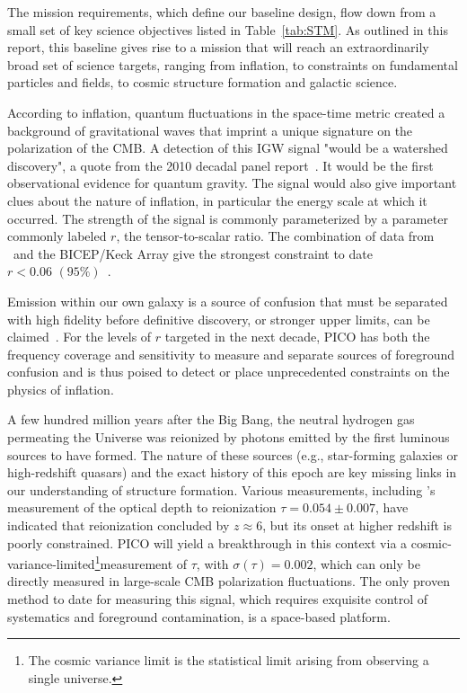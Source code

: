 \documentclass[PICOReport.tex]{subfiles}
\begin{document}
The mission requirements, which define our baseline design, flow down from a small set of key science objectives listed in Table~\ref{tab:STM}. As outlined in this report, this baseline gives rise to a mission that will reach an extraordinarily broad set of science targets, ranging from inflation, to constraints on fundamental particles and fields, to cosmic structure formation and galactic science.

According to inflation, quantum fluctuations in the space-time metric created a background of gravitational waves that imprint a unique signature on the polarization of the CMB. A detection of this \ac{IGW} signal "would be a watershed discovery", a quote from the 2010 decadal panel report~\citep{blandford2010}. It would be the first observational evidence for quantum gravity. The signal would also give important clues about the nature of inflation, in particular the energy scale at which it occurred. The strength of the signal is commonly parameterized by a parameter commonly labeled $r$, the tensor-to-scalar ratio. The combination of data from \planck\ and the BICEP/Keck Array give the strongest constraint to date $r<0.06\,\, (95\%)$~\citep{2018arXiv181005216A}.

Emission within our own galaxy is a source of confusion that must be separated with high fidelity before definitive discovery, or stronger upper limits, can be claimed~\citep{2016A&A...586A.133P}. For the levels of $r$ targeted in the next decade, PICO has both the frequency coverage and sensitivity to measure and separate sources of foreground confusion and is thus poised to detect or place unprecedented constraints on the physics of inflation. 

A few hundred million years after the Big Bang, the neutral hydrogen gas permeating the Universe was reionized by photons emitted by the first luminous sources to have formed.  The nature of these sources (e.g., star-forming galaxies or high-redshift quasars) and the exact history of this epoch are key missing links in our understanding of structure formation.  Various measurements, including \planck 's measurement of the optical depth to reionization $\tau = 0.054 \pm 0.007$, have indicated that reionization concluded by $z \approx 6$, but its onset at higher redshift is poorly constrained. PICO will yield a breakthrough in this context via a cosmic-variance-limited\footnote{The cosmic variance limit is the statistical limit arising from observing a single universe.}measurement of $\tau$, with $\sigma(\tau)=0.002$, which can only be directly measured in large-scale CMB polarization fluctuations.  The only proven method to date for measuring this signal, which requires exquisite control of systematics and foreground contamination, is a space-based platform.
\end{document}
